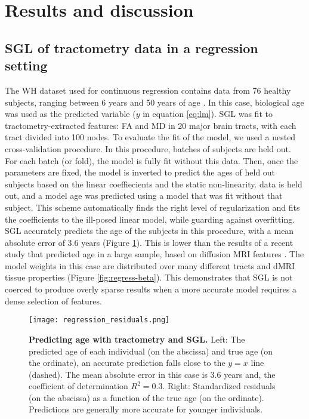\section*{Results and discussion}

\subsection*{SGL of tractometry data in a regression setting}

The WH dataset used for continuous regression contains data from 76 healthy
subjects, ranging between 6 years and 50 years of age
\cite{yeatman2014lifespan}. In this case, biological age was used as the
predicted variable ($y$ in equation \ref{eq:lm}). SGL was fit to
tractometry-extracted features: FA and MD in 20 major brain tracts, with each
tract divided into 100 nodes. To evaluate the fit of the model, we used a nested
cross-validation procedure. In this procedure, batches of subjects are held out.
For each batch (or fold), the model is fully fit without this data. Then, once
the parameters are fixed, the model is inverted to predict the ages of held out
subjects based on the linear coeffiecients and the static non-linearity. data is
held out, and a model age was predicted using a model that was fit without that
subject. This scheme automatically finds the right level of regularization and
fits the coefficients to the ill-posed linear model, while guarding against
overfitting. SGL accurately predicts the age of the subjects in this procedure,
with a mean absolute error of 3.6 years (Figure \ref{fig:regress-results}). This
is lower than the results of a recent study that predicted age in a large
sample, based on diffusion MRI features \cite{Richard2018-ux}. The model weights
in this case are distributed over many different tracts and dMRI tissue
properties (Figure \ref{fig:regress-beta}). This demonstrates that SGL is not
coerced to produce overly sparse results when a more accurate model requires a
dense selection of features.


\begin{figure}[!h]
    \centering
    \texttt{[image: regression\_residuals.png]}
    \caption{{\bf Predicting age with tractometry and SGL.} Left: The predicted age of each individual (on the abscissa) and true age (on the ordinate), an accurate prediction falls close to the $y=x$ line (dashed). The mean absolute error in this case  is 3.6 years and, the coefficient of determination $R^2=0.3$. Right: Standardized residuals (on the abscissa) as a function of the true age (on the ordinate). Predictions are generally more accurate for younger individuals.
    }
    \label{fig:regress-results}
\end{figure}

